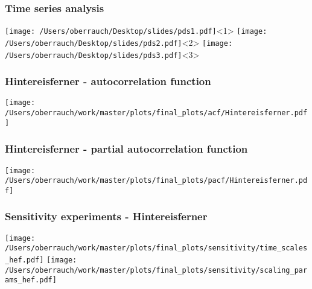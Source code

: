 \documentclass[12pt, aspectratio=169, abstract=off, oneside]{beamer}
\begin{document}
    \begin{frame}[t]\frametitle{Time series analysis}

        \centering
        \vfill
        \texttt{[image: /Users/oberrauch/Desktop/slides/pds1.pdf]}<1>%
        \texttt{[image: /Users/oberrauch/Desktop/slides/pds2.pdf]}<2>%
        \texttt{[image: /Users/oberrauch/Desktop/slides/pds3.pdf]}<3>%
    
    \end{frame}

    \begin{frame}[t]\frametitle{Hintereisferner - autocorrelation function}
        \centering
        \vfill
        \texttt{[image: /Users/oberrauch/work/master/plots/final\_plots/acf/Hintereisferner.pdf]}
    
    \end{frame}

    \begin{frame}[t]\frametitle{Hintereisferner - partial autocorrelation function}
        \centering
        \vfill
        \texttt{[image: /Users/oberrauch/work/master/plots/final\_plots/pacf/Hintereisferner.pdf]}
    
    \end{frame}


    \begin{frame}[t]\frametitle{Sensitivity experiments - Hintereisferner}
        \centering
        \vfill
        \texttt{[image: /Users/oberrauch/work/master/plots/final\_plots/sensitivity/time\_scales\_hef.pdf]}
        \texttt{[image: /Users/oberrauch/work/master/plots/final\_plots/sensitivity/scaling\_params\_hef.pdf]}
    \end{frame}
\end{document}
